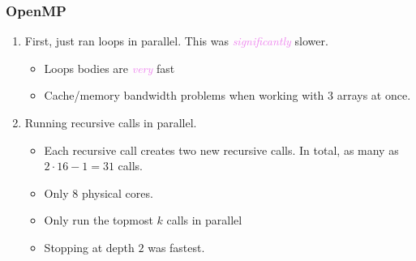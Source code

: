 \documentclass{beamer}
\newcommand{\its}[1]{\textcolor{violet}{\emph{#1}}}
\begin{document}
\begin{frame}
    \frametitle{OpenMP}

    \begin{enumerate}[label=(\roman*)]
        \item First, just ran loops in parallel. This was \its{significantly}
            slower. \pause
            \begin{itemize}
                \item Loops bodies are \its{very} fast \pause
                \item Cache/memory bandwidth problems when working with 3 arrays
                    at once.
            \end{itemize}
            \pause \medbreak

        \item Running recursive calls in parallel. \pause
            \begin{itemize}
                \item Each recursive call creates two new recursive calls. In
                    total, as many as $2 \cdot 16 - 1 = 31$ calls. \pause
                \item  Only 8 physical cores. \pause
                \item Only run the topmost $k$ calls in parallel
                \item Stopping at depth $2$ was fastest.
            \end{itemize}

            \vfill

            \begin{center}
                
            \end{center}
    \end{enumerate}

\end{frame}
\end{document}
